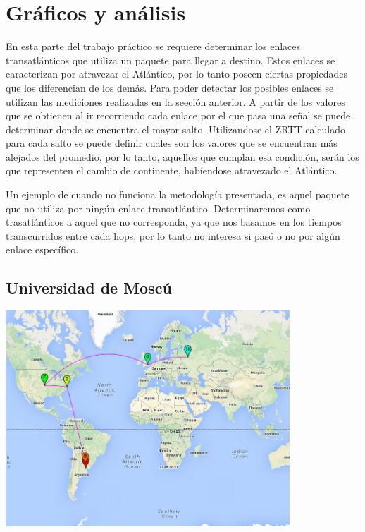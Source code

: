 \section{Gráficos y análisis}

En esta parte del trabajo práctico se requiere determinar los enlaces transatlánticos que utiliza un paquete para llegar a destino. Estos enlaces se caracterizan por atravezar el Atlántico, por lo tanto poseen ciertas propiedades que los diferencian de los demás. Para poder detectar los posibles enlaces se utilizan las mediciones realizadas en la seeción anterior. A partir de los valores que se obtienen al ir recorriendo cada enlace por el que pasa una señal se puede determinar donde se encuentra el mayor salto.
Utilizandose el ZRTT calculado para cada salto se puede definir cuales son los valores que se encuentran más alejados del promedio, por lo tanto, aquellos que cumplan esa condición, serán los que representen el cambio de continente, habíendose atravezado el Atlántico.

Un ejemplo de cuando no funciona la metodología presentada, es aquel paquete que no utiliza por ningún enlace transatlántico. Determinaremos como trasatlánticos a aquel que no corresponda, ya que nos basamos en los tiempos transcurridos entre cada hops, por lo tanto no interesa si pasó o no por algún enlace específico.

\subsection{Universidad de Moscú}
\centerline{\includegraphics[width=0.8\textwidth]{mapas/rusia.png}}

